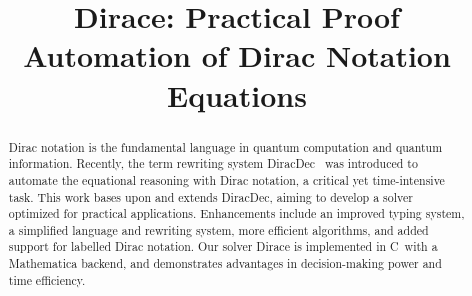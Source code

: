 \documentclass[runningheads]{llncs}
\newcommand{\CC}{C\nolinebreak\hspace{-.05em}\raisebox{.4ex}{\tiny\bf +}\nolinebreak\hspace{-.10em}\raisebox{.4ex}{\tiny\bf +}}
\def\CC{{C\nolinebreak[4]\hspace{-.05em}\raisebox{.4ex}{\tiny\bf ++}}}
\begin{document}
%
\title{Dirace: Practical Proof Automation of Dirac Notation Equations}




%
\maketitle              %
%
\begin{abstract}

    Dirac notation is the fundamental language in quantum computation and quantum information. Recently, the term rewriting system DiracDec~\cite{diracdec} was introduced to automate the equational reasoning with Dirac notation, a critical yet time-intensive task. This work bases upon and extends DiracDec, aiming to develop a solver optimized for practical applications. Enhancements include an improved typing system, a simplified language and rewriting system, more efficient algorithms, and added support for labelled Dirac notation. Our solver Dirace is implemented in \CC\ with a Mathematica backend, and demonstrates advantages in decision-making power and time efficiency.


\end{abstract}
%
%
%



\newcommand*{\sem}[1]{{\llbracket #1 \rrbracket}}
\newcommand{\DiracDec}{\textsf{DiracDec}}
\end{document}
